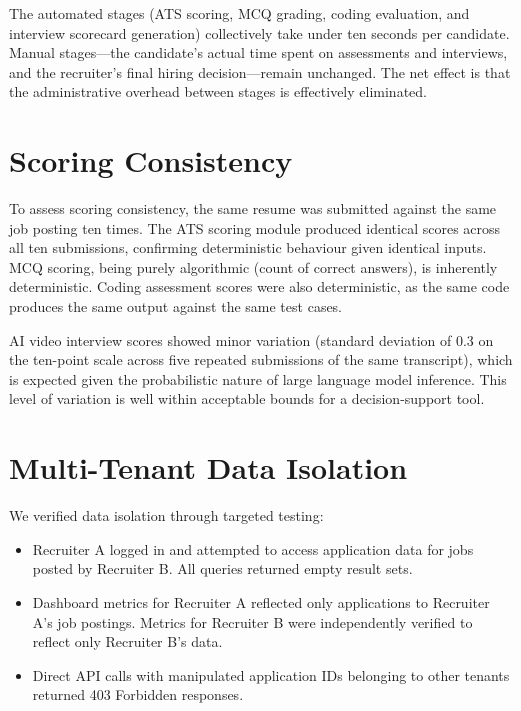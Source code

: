 The automated stages (ATS scoring, MCQ grading, coding evaluation, and interview scorecard generation) collectively take under ten seconds per candidate. Manual stages---the candidate's actual time spent on assessments and interviews, and the recruiter's final hiring decision---remain unchanged. The net effect is that the administrative overhead between stages is effectively eliminated.

\section{Scoring Consistency}
\label{sec:consistency}

To assess scoring consistency, the same resume was submitted against the same job posting ten times. The ATS scoring module produced identical scores across all ten submissions, confirming deterministic behaviour given identical inputs. MCQ scoring, being purely algorithmic (count of correct answers), is inherently deterministic. Coding assessment scores were also deterministic, as the same code produces the same output against the same test cases.

AI video interview scores showed minor variation (standard deviation of 0.3 on the ten-point scale across five repeated submissions of the same transcript), which is expected given the probabilistic nature of large language model inference. This level of variation is well within acceptable bounds for a decision-support tool.

\section{Multi-Tenant Data Isolation}
\label{sec:isolation-results}

We verified data isolation through targeted testing:

\begin{itemize}[leftmargin=1.5em]
  \item Recruiter A logged in and attempted to access application data for jobs posted by Recruiter B. All queries returned empty result sets.
  \item Dashboard metrics for Recruiter A reflected only applications to Recruiter A's job postings. Metrics for Recruiter B were independently verified to reflect only Recruiter B's data.
  \item Direct API calls with manipulated application IDs belonging to other tenants returned 403 Forbidden responses.
\end{itemize}

